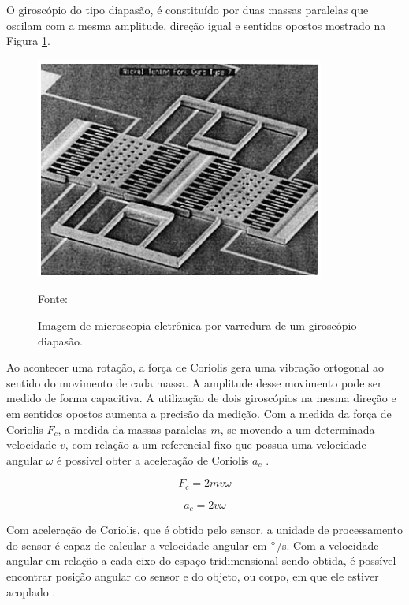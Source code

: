 			O giroscópio do tipo diapasão, é constituído por duas massas paralelas que oscilam com a mesma amplitude, direção igual e sentidos opostos mostrado na Figura \ref{gyro}.
			
			\begin{figure}[h]
				\centering
				\includegraphics[keepaspectratio=true,scale=0.7
				]{figuras/diapasao.png}
				\caption{ Imagem de microscopia eletrônica por varredura de um giroscópio diapasão.}
				Fonte: \cite{forhan2010}
				\label{gyro}	
			\end{figure}
			
			Ao acontecer uma rotação, a força de Coriolis gera uma vibração ortogonal ao sentido do movimento de cada massa. A amplitude desse movimento pode ser medido de forma capacitiva. A utilização de dois giroscópios na mesma direção e em sentidos opostos aumenta a precisão da medição. Com a medida da força de Coriolis  $F_{c}$, a medida da massas paralelas $m$, se movendo a um determinada velocidade $v$, com relação a um referencial fixo que possua uma velocidade angular $ \omega $ é possível obter a aceleração de Coriolis $a_{c}$ \cite{forhan2010}.
			
			\begin{equation}
			F_{c} = 2mv\omega
			\end{equation}
			
			\begin{equation}
			a_{c} = 2v\omega
			\end{equation}
			
			Com aceleração de Coriolis, que é obtido pelo sensor, a unidade de processamento do sensor é capaz de calcular a velocidade angular em $\degree$/s. Com a velocidade angular em relação a cada eixo do espaço tridimensional sendo obtida, é possível encontrar posição angular do sensor e do objeto, ou corpo, em que ele estiver acoplado \cite{forhan2010}\cite{moyses2013}. 
			
